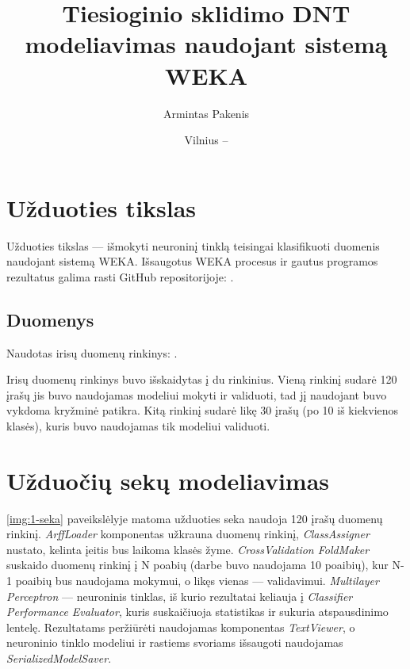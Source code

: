 \documentclass{VUMIFPSbakalaurinis}
\institute{Informatikos institutas}  %
\title{Tiesioginio sklidimo DNT modeliavimas naudojant sistemą WEKA}
\author{Armintas Pakenis}
\date{Vilnius – \the\year}
\begin{document}
\maketitle


\tableofcontents

\section{Užduoties tikslas}
Užduoties tikslas — išmokyti neuroninį tinklą teisingai
klasifikuoti duomenis naudojant sistemą WEKA. 
Išsaugotus WEKA procesus ir gautus programos rezultatus
galima rasti GitHub repositorijoje: 
\href{https://github.com/ArmintasP/Computational-intelligence/tree/main/Lab3}{\color{cyan}{https://github.com/ArmintasP/Computational-intelligence/tree/main/Lab3}}.

\subsection{Duomenys}
Naudotas irisų duomenų rinkinys: 
\href{https://archive.ics.uci.edu/ml/datasets/iris}{\color{cyan}{https://archive.ics.uci.edu/ml/datasets/iris}}.

Irisų duomenų rinkinys buvo išskaidytas į du rinkinius.
Vieną rinkinį sudarė 120 įrašų jis buvo naudojamas modeliui mokyti ir validuoti,
tad jį naudojant buvo vykdoma kryžminė patikra.
Kitą rinkinį sudarė likę 30 įrašų (po 10 iš kiekvienos klasės), 
kuris buvo naudojamas tik modeliui validuoti.

\section{Užduočių sekų modeliavimas}

\ref{img:1-seka} paveikslėlyje matoma užduoties seka naudoja
120 įrašų duomenų rinkinį. \textit{ArffLoader} komponentas
užkrauna duomenų rinkinį, \textit{ClassAssigner} nustato,
kelinta įeitis bus laikoma klasės žyme. 
\textit{CrossValidation FoldMaker} suskaido duomenų rinkinį
į N poabių (darbe buvo naudojama 10 poaibių), kur N-1 poaibių
bus naudojama mokymui, o likęs vienas — validavimui.
\textit{Multilayer Perceptron} — neuroninis tinklas, iš kurio
rezultatai keliauja į \textit{Classifier Performance Evaluator},
kuris suskaičiuoja statistikas ir sukuria atspausdinimo lentelę.
Rezultatams peržiūrėti naudojamas komponentas \textit{TextViewer},
o neuroninio tinklo modeliui ir rastiems svoriams išsaugoti
naudojamas \textit{SerializedModelSaver}.   
\end{document}
